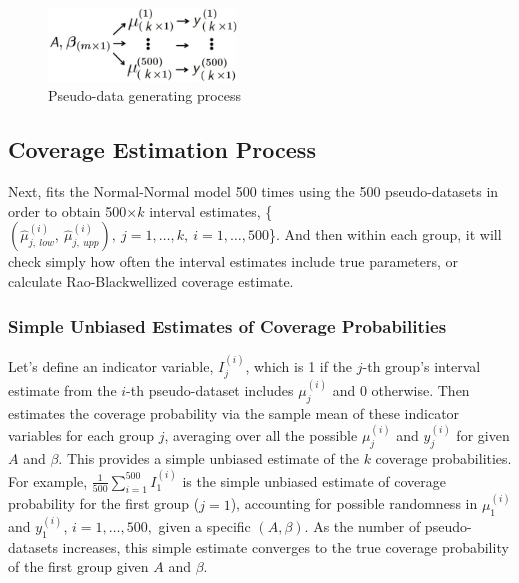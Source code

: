 \documentclass[article]{jss}
\begin{document}
\begin{figure}[h]
\begin{center}
\includegraphics[width=5cm]{process.png}
\caption{Pseudo-data generating process}
\label{fig:pseudo}
\end{center}
\end{figure}

\subsection{Coverage Estimation Process}
Next,  fits the Normal-Normal model 500 times using the 500 pseudo-datasets in order to obtain 500$\times k$ interval estimates,  \{$(\hat{\mu}^{(i)}_{j, ~low}, ~\hat{\mu}^{(i)}_{j, ~upp}), ~j=1,\ldots, k,~ i=1, \ldots, 500$\}.  And then within each group, it will check simply how often the interval estimates include true parameters, or calculate Rao-Blackwellized coverage estimate. 

\subsubsection{Simple Unbiased Estimates of Coverage Probabilities}
Let's define an indicator variable, $I^{(i)}_{j}$, which is 1 if the $j$-th group's interval estimate from the $i$-th pseudo-dataset includes $\mu^{(i)}_{j}$ and 0 otherwise. Then  estimates the coverage probability via the sample mean of these indicator variables for each group $j$, averaging over all the possible $\mu^{(i)}_{j}$ and $y^{(i)}_{j}$ for given $A$ and $\beta$. This provides a simple unbiased estimate of the $k$ coverage probabilities. For example, $\frac{1}{500}\sum_{i=1}^{500}I^{(i)}_{1}$ is the simple unbiased estimate of coverage probability for the first group ($j=1$), accounting for possible randomness in $\mu^{(i)}_{1}$ and $y^{(i)}_{1}$, $i=1, \ldots, 500,$ given a specific $(A, \beta)$. As the number of pseudo-datasets increases, this simple estimate converges to the true coverage probability of the first group given $A$ and $\beta$.
\end{document}
